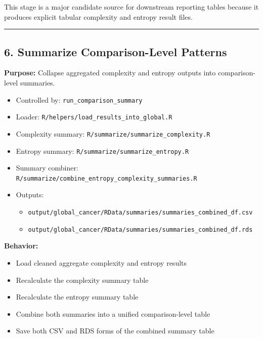 \documentclass[
  letterpaper,
  DIV=11,
  numbers=noendperiod,
  openany,
  oneside]{scrreprt}
\providecommand{\tightlist}{%
  \setlength{\itemsep}{0pt}\setlength{\parskip}{0pt}}
\begin{document}
This stage is a major candidate source for downstream reporting tables
because it produces explicit tabular complexity and entropy result
files.

\begin{center}\rule{0.5\linewidth}{0.5pt}\end{center}

\subsection*{6. Summarize Comparison-Level
Patterns}\label{summarize-comparison-level-patterns}

\textbf{Purpose:} Collapse aggregated complexity and entropy outputs
into comparison-level summaries.

\begin{itemize}
\tightlist
\item
  Controlled by: \texttt{run\_comparison\_summary}
\item
  Loader: \texttt{R/helpers/load\_results\_into\_global.R}
\item
  Complexity summary: \texttt{R/summarize/summarize\_complexity.R}
\item
  Entropy summary: \texttt{R/summarize/summarize\_entropy.R}
\item
  Summary combiner:
  \texttt{R/summarize/combine\_entropy\_complexity\_summaries.R}
\item
  Outputs:

  \begin{itemize}
  \tightlist
  \item
    \texttt{output/global\_cancer/RData/summaries/summaries\_combined\_df.csv}
  \item
    \texttt{output/global\_cancer/RData/summaries/summaries\_combined\_df.rds}
  \end{itemize}
\end{itemize}

\textbf{Behavior:}

\begin{itemize}
\tightlist
\item
  Load cleaned aggregate complexity and entropy results
\item
  Recalculate the complexity summary table
\item
  Recalculate the entropy summary table
\item
  Combine both summaries into a unified comparison-level table
\item
  Save both CSV and RDS forms of the combined summary table
\end{itemize}
\end{document}
